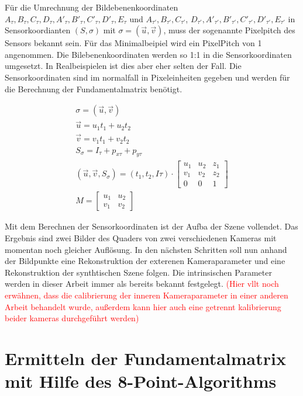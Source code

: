 Für die Umrechnung der Bildebenenkoordinaten $A_\tau,B_\tau,C_\tau,D_\tau,A'_\tau,B'_\tau,C'_\tau,D'_\tau, E_\tau$ und $A_{\tau'},B_{\tau'},C_{\tau'}$, $D_{\tau'},A'_{\tau'},B'_{\tau'},C'_{\tau'},D'_{\tau'}, E_{\tau'}$ in Sensorkoordianten $(S,\sigma)$ mit $\sigma = (\vec{u},\vec{v})$, muss der sogenannte Pixelpitch des Sensors bekannt sein. Für das Minimalbeipiel wird ein PixelPitch von 1 angenommen. Die Bilebenenkoordinaten werden so 1:1 in die Sensorkoordinaten umgesetzt. In Realbeispielen ist dies aber eher selten der Fall. Die Sensorkoordinaten sind im normalfall in Pixeleinheiten gegeben und werden für die Berechnung der Fundamentalmatrix benötigt.

\begin{gather}
\sigma = (\vec{u},\vec{v})\\	
\vec{u} = u_1t_1+u_2t_2\\
\vec{v} = v_1t_1+v_2t_2\\
S_\sigma = I_\tau +p_{x\tau}+p_{y\tau}\\
(\vec{u},\vec{v}, S_\sigma)=(t_1,t_2,I\tau)\cdot
\begin{bmatrix}
u_1&u_2&z_1\\
v_1&v_2&z_2\\
0&0&1
\end{bmatrix}	\\
M = 	
\begin{bmatrix}
u_1&u_2\\
v_1&v_2
\end{bmatrix}
\end{gather}

Mit dem Berechnen der Sensorkoordinaten ist der Aufba der Szene vollendet. Das Ergebnis sind zwei Bilder des Quaders von zwei verschiedenen Kameras mit momentan noch gleicher Auflösung. In den nächsten Schritten soll nun anhand der Bildpunkte eine Rekonstruktion der exterenen Kameraparameter und eine Rekonstruktion der synthtischen Szene folgen. Die intrinsischen Parameter werden in dieser Arbeit immer als bereits bekannt festgelegt. \textcolor{red}{(Hier vllt noch erwähnen, dass die calibrierung der inneren Kameraparameter in einer anderen Arbeit behandelt wurde, außerdem kann hier auch eine getrennt kalibrierung beider kameras durchgeführt werden) }

\section{Ermitteln der Fundamentalmatrix mit Hilfe des 8-Point-Algorithms}




